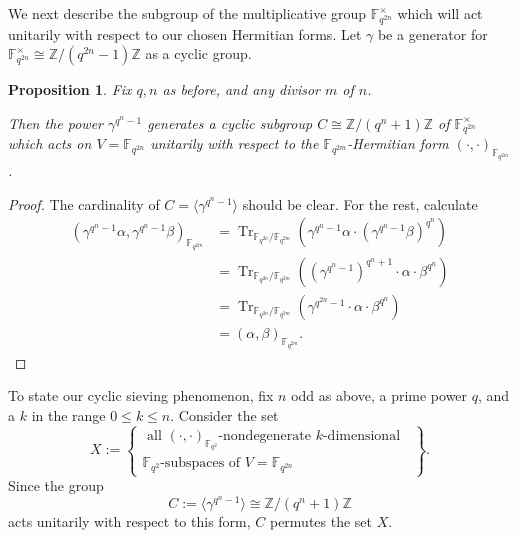 \documentclass[10pt]{amsart}
\theoremstyle{plain}
\newtheorem{proposition}[theorem]{Proposition}
\theoremstyle{definition}
\theoremstyle{remark}
\numberwithin{equation}{section}
\newcommand\Tr{\operatorname{Tr}}
\newcommand\FF{\mathbb{F}}
\newcommand\ZZ{\mathbb{Z}}
\begin{document}
We next describe the subgroup of the multiplicative
group $\FF_{q^{2n}}^\times$ which will act unitarily with respect
to our chosen Hermitian forms.  Let $\gamma$ be a 
generator for $\FF_{q^{2n}}^\times\cong \ZZ/(q^{2n}-1)\ZZ$ 
as a cyclic group.


\begin{proposition}
Fix $q,n$ as before, and any divisor $m$ of $n$.

Then the power $\gamma^{q^n-1}$ generates a cyclic subgroup 
$C \cong  \ZZ/(q^{n}+1)\ZZ$ of $\FF_{q^{2n}}^\times$
which acts on $V=\FF_{q^{2n}}$ unitarily with respect to
the $\FF_{q^{2m}}$-Hermitian form $(\cdot,\cdot)_{\FF_{q^{2m}}}$.
\end{proposition}
\begin{proof}
The cardinality of 
$C=\langle \gamma^{q^n-1} \rangle$ should be clear.  For the rest, calculate
$$
\begin{aligned}
(\gamma^{q^n-1} \alpha, \gamma^{q^n-1} \beta)_{\FF_{q^{2m}}}
&= \Tr_{\FF_{q^{2n}}/\FF_{q^{2m}}} \left(\gamma^{q^n-1} \alpha \cdot (\gamma^{q^n-1} \beta)^{q^n} \right) \\
&= \Tr_{\FF_{q^{2n}}/\FF_{q^{2m}}} \left((\gamma^{q^n-1})^{q^n+1} \cdot \alpha \cdot \beta^{q^n} \right) \\
&= \Tr_{\FF_{q^{2n}}/\FF_{q^{2m}}} \left(\gamma^{q^{2n}-1} \cdot \alpha \cdot \beta^{q^n} \right) \\
&=(\alpha,\beta)_{\FF_{q^{2m}}}.
\end{aligned}
$$
\end{proof}

To state our cyclic sieving phenomenon, fix $n$ odd as above,  
a prime power $q$, and a $k$ in the range $0 \leq k \leq n$.
Consider the set 
$$
X:=
\left\{ 
\begin{matrix}
\text{ all }(\cdot,\cdot)_{\FF_{q^2}}\text{-nondegenerate }k\text{-dimensional }\ \\
\FF_{q^2}\text{-subspaces of }V=\FF_{q^{2n}} 
\end{matrix}
\right\}.
$$
Since the group 
$$
C:=\langle \gamma^{q^n-1} \rangle \cong \ZZ/(q^n+1)\ZZ
$$ 
acts unitarily with respect to this form, $C$ permutes the set $X$.
\end{document}
